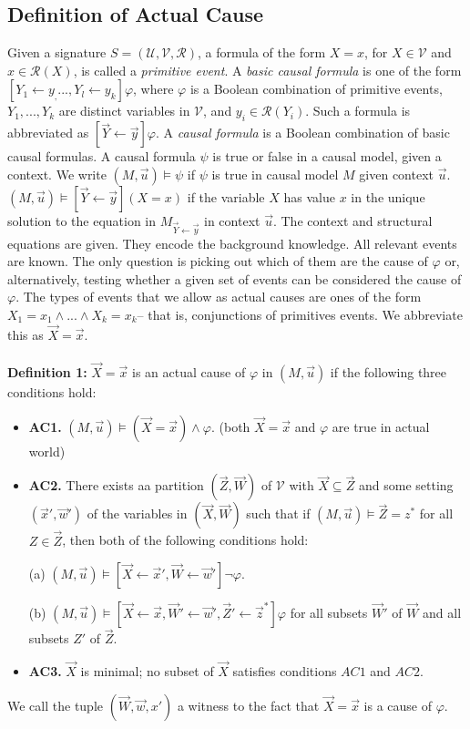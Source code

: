 \documentclass{article}
\begin{document}
\subsection{Definition of Actual Cause}
Given a signature $S= (\mathcal{U},\mathcal{V},\mathcal{R})$, a formula of the form $X =x$, for $X \in \mathcal{V}$ and $x \in \mathcal{R}(X)$, is called a \textit{primitive event}.
A \textit{basic causal formula} is one of the form $[Y_1 \leftarrow y_, ..., Y_l\leftarrow y_k]\varphi$, where $\varphi$ is a Boolean combination of primitive events, $Y_1,...,Y_k$ are distinct variables in $\mathcal{V}$, and $y_i \in \mathcal{R}(Y_i)$.
Such a formula is abbreviated as $[\vec{Y}\leftarrow\vec{y}]\varphi$.
A \textit{causal formula} is a Boolean combination of basic causal formulas.
A causal formula $\psi$ is true or false in a causal model, given a context.
We write $(M,\vec u)\models \psi$ if $\psi$ is true in causal model $M$ given context $\vec u$.
$(M,\vec u)\models [\vec Y\leftarrow \vec y](X=x)$ if the variable $X$ has value $x$ in the unique solution to the equation in $M_{\vec{Y} \leftarrow \vec{y}}$ in context $\vec u$.
The context and structural equations are given.
They encode the background knowledge.
All relevant events are known.
The only question is picking out which of them are the cause of $\varphi$ or, alternatively, testing whether a given set of events can be considered the cause of $\varphi$.
The types of events that we allow as actual causes are ones of the form $X_1 = x_1 \wedge ... \wedge X_k=x_k$-- that is, conjunctions of primitives events.
We abbreviate this as $\vec X = \vec x$.
\\
\\
\textbf{Definition 1:} $\vec X = \vec x$ is an actual cause of $\varphi$ in $(M,\vec u)$ if the following three conditions hold:
\begin{itemize}
    \item  \textbf{AC1.} $(M,\vec u)\models (\vec X = \vec x) \wedge \varphi$.
          (both $\vec X = \vec x$ and $\varphi$ are true in actual world)
    \item  \textbf{AC2. }There exists aa partition $(\vec Z, \vec W)$ of $\mathcal{V}$ with $\vec X \subseteq \vec Z$ and some setting $(\vec x',\vec w')$ of the variables in $(\vec X,\vec W)$ such that if $(M,\vec u)\models \vec Z = z^*$ for all $Z\in \vec Z$, then both of the following conditions hold:

          (a) $(M,\vec u)\models[\vec X \leftarrow \vec x', \vec W \leftarrow \vec w']\neg \varphi$.

          (b) $(M,\vec u)\models[\vec X\leftarrow \vec x, \vec W' \leftarrow \vec w', \vec Z'\leftarrow \vec z^*]\varphi$ for all subsets $\vec W'$ of $\vec W$ and all subsets $Z'$ of $\vec Z$.

    \item  \textbf{AC3.} $\vec X$ is minimal; no subset of $\vec X$ satisfies conditions $AC1$ and $AC2$.
\end{itemize}
We call the tuple $(\vec W, \vec w,x')$ a witness to the fact that $\vec X=\vec x$ is a cause of $\varphi$.
\end{document}
